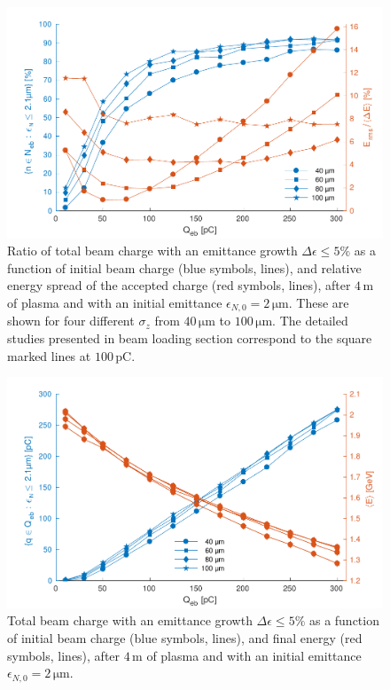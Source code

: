 \documentclass[aps,prstab,reprint,amsmath,amssymb,groupedaddress,onecolumn]{revtex4-1}
\newcommand{\unit}[1]{\,\mathrm{#1}}
\begin{document}
\begin{figure}[hbt]
    \includegraphics[width=\linewidth,trim={2mm 0mm 2mm 0mm},clip]{figures/beamQuality}
    \caption{\label{Fig:BeamQ} Ratio of total beam charge with an emittance growth $\Delta\epsilon \leq 5\%$ as a
        function of initial beam charge (blue %
        symbols, lines), and relative energy spread of the accepted charge (red %
        symbols, lines), after
        $4\unit{m}$ of plasma and with an initial emittance $\epsilon_{N,0}=2\unit{\mu m}$. These are shown for four
        different $\sigma_{z}$ from $40\unit{\mu m}$ to $100\unit{\mu m}$. The detailed studies presented in beam
        loading section correspond to the square marked lines at $100\unit{pC}$.}
\end{figure}

\begin{figure}[hbt]
    \includegraphics[width=\linewidth,trim={2mm 0mm 2mm 0mm},clip]{figures/beamQualityAbs}
    \caption{\label{Fig:BeamQAbs} Total beam charge with an emittance growth $\Delta\epsilon \leq 5\%$ as a function of
        initial beam charge (blue %
        symbols, lines), and final %
        energy (red %
        symbols, lines), after $4\unit{m}$ of plasma and with an initial emittance
        $\epsilon_{N,0}=2\unit{\mu m}$.}
\end{figure}
\end{document}
